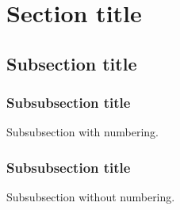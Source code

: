 \section{Section title}

\subsection{Subsection title}

\subsubsection{Subsubsection title}
Subsubsection with numbering.

\subsubsection*{Subsubsection title}
Subsubsection without numbering.